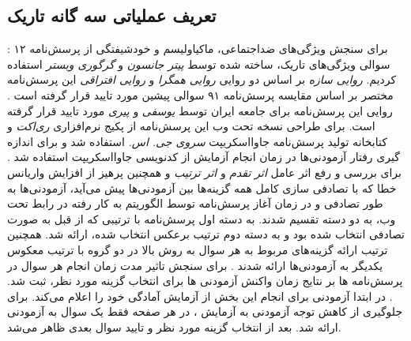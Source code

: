 \subsection{تعریف عملیاتی سه گانه تاریک}
:
برای سنجش ویژگی‌های ضداجتماعی، ماکیاولیسم و خودشیفتگی از پرسش‌نامه ۱۲ سوالی ویژگی‌های تاریک، ساخته شده توسط
\textit{
    پیتر جانسون }
و
\textit{
    گرگوری وبستر}
استفاده کردیم.
\!\citep{jonasonDirtyDozenConcise2010}
\textit{
    روایی سازه
}
بر اساس دو روایی
\textit{
    روایی همگرا
}
و
\textit{
    روایی افتراقی
}
این پرسش‌نامه مختصر بر اساس مقایسه پرسش‌نامه ۹۱ سوالی پیشین مورد تایید قرار گرفته است
\!\citep{jonasonDirtyDozenConcise2010}
\!.
روایی این پرسش‌نامه برای جامعه ایران توسط
\textit{
    یوسفی
}
و
\textit{
    پیری
}
\!\citep{ywsfyWyjgyHyRwn2016}
مورد تایید قرار گرفته است.
برای طراحی نسخه تحت وب این پرسش‌نامه از پکیج نرم‌افزاری
\textit{
    ری‌اکت
}
و کتابخانه تولید پرسش‌نامه جاوااسکریپت
\textit{
    سروی جی. اس.
}
استفاده شد و برای اندازه گیری رفتار آزمودنی‌ها در زمان انجام آزمایش از کدنویسی جاوااسکریپت استفاده شد
\!.
برای بررسی و رفع اثر عامل
\textit{
    اثر تقدم
}
و
\textit{
    اثر ترتیب
}
\!\citep{dillmanMultipleAnswerQuestions2003,krosnickEVALUATIONCOGNITIVETHEORY1987,leeEffectQuestionOrder2009}
و همچنین پرهیز از افزایش واریانس خطا که
با تصادفی سازی کامل همه گزینه‌ها بین آزمودنی‌ها پیش می‌آید،
\!\citep{dillmanMultipleAnswerQuestions2003}
آزمودنی‌ها به طور تصادفی و در زمان آغاز پرسش‌نامه
توسط الگوریتم به کار رفته در رابط تحت وب، به دو دسته تقسیم
شدند. به دسته اول پرسش‌نامه با ترتیبی که از قبل به
صورت تصادفی انتخاب شده بود و به دسته دوم ترتیب برعکس  انتخاب شده،
ارائه شد. همچنین ترتیب
ارائه گزینه‌های مربوط به هر سوال به روش بالا در دو گروه با ترتیب معکوس یکدیگر به آزمودنی‌ها ارائه شدند
{\citep{dayOrderingEffectsChoice2012}}
{.}
برای سنجش تاثیر مدت زمان انجام هر سوال در پرسش‌نامه ها
بر نتایج زمان واکنش  آزمودنی ها برای انتخاب گزینه مورد نظر،
ثبت شد.
{\citep{malhotraCompletionTimeResponse2008}}
{.}
در ابتدا آزمودنی برای انجام این بخش از آزمایش آمادگی خود را اعلام می‌کند.
برای جلوگیری از کاهش توجه آزمودنی به آزمایش
\!\citep{meadeIdentifyingCarelessResponses2012}
،
در هر صفحه فقط یک سوال به آزمودنی ارائه شد.
بعد از انتخاب گزینه مورد نظر و تایید سوال بعدی ظاهر می‌شد.

